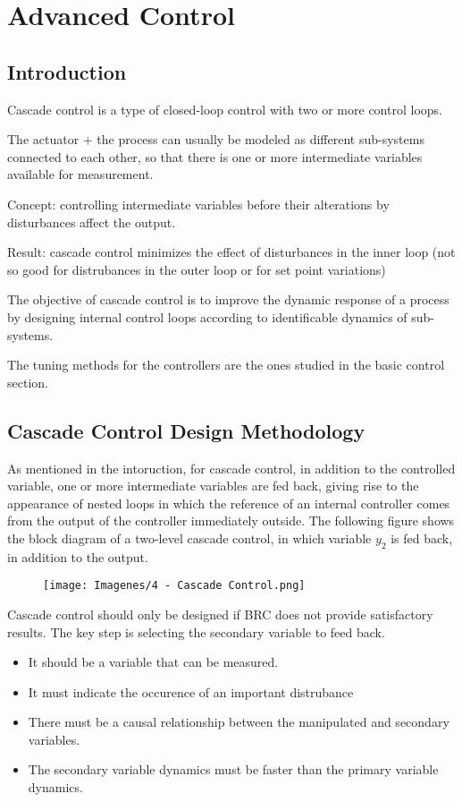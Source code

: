 \chapter{Advanced Control}
\section{Introduction}
Cascade control is a type of closed-loop control with two or more control loops.

The actuator + the process can usually be modeled as different sub-systems connected to each other, so that there is one or more intermediate variables available for measurement.

Concept: controlling intermediate variables before their alterations by disturbances affect the output.

Result: cascade control minimizes the effect of disturbances in the inner loop (not so good for distrubances in the outer loop or for set point variations)

The objective of cascade control is to improve the dynamic response of a process by designing internal control loops according to identificable dynamics of sub-systems.

The tuning methods for the controllers are the ones studied in the basic control section.

\section{Cascade Control Design Methodology}
As mentioned in the intoruction, for cascade control, in addition to the controlled variable, one or more intermediate variables are fed back, giving rise to the appearance of nested loops in which the reference of an internal controller comes from the output of the controller immediately outside. The following figure shows the block diagram of a two-level cascade control, in which variable $y_2$ is fed back, in addition to the output.

\begin{figure}[H]
    \centering
    \texttt{[image: Imagenes/4 - Cascade Control.png]}
\end{figure}

Cascade control should only be designed if BRC does not provide satisfactory results. The key step is selecting the secondary variable to feed back.

\begin{itemize}
    \item It should be a variable that can be measured.
    \item It must indicate the occurence of an important distrubance
    \item There must be a causal relationship between the manipulated and secondary variables.
    \item The secondary variable dynamics must be faster than the primary variable dynamics.
\end{itemize}

